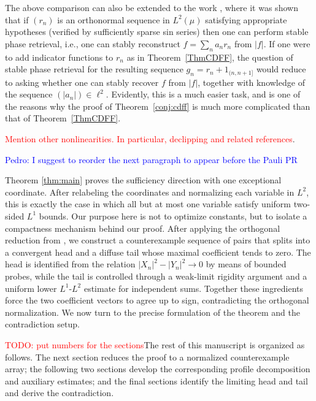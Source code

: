 \documentclass[11pt]{amsart}
\begin{document}
The above comparison can also be extended to the work \cite{christ2022examples}, where it was shown that if $(r_n)$ is an orthonormal sequence in $L^2(\mu)$ satisfying appropriate hypotheses (verified by sufficiently sparse sin series) then one can perform stable phase retrieval, i.e., one can stably reconstruct $f=\sum_n a_n r_n$ from $|f|$. If one were to add indicator functions to $r_n$ as in Theorem~\ref{ThmCDFF}, the question of stable phase retrieval for the resulting sequence $g_n=r_n+1_{(n,n+1]}$ would reduce to asking whether one can stably recover $f$ from $|f|$, together with knowledge of the sequence $(|a_n|)\in \ell^2.$ Evidently, this is a much easier task, and is one of the reasons why the proof of Theorem~\ref{conj:cdff} is much more complicated than that of Theorem~\ref{ThmCDFF}.




\textcolor{red}{Mention other nonlinearities. In particular, declipping \cite{abdalla2025sharp} and related references}.



\textcolor{blue}{Pedro: I suggest to reorder the next paragraph to appear before the Pauli PR}

Theorem \ref{thm:main} proves the sufficiency direction with
one exceptional coordinate. After relabeling the coordinates and normalizing
each variable in $L^2$, this is exactly the case in which all but at most one
variable satisfy uniform two-sided $L^1$ bounds. Our purpose here is not to
optimize constants, but to isolate a compactness mechanism behind our proof.
After applying the orthogonal reduction from \cite{FOTP}, we construct a counterexample sequence of pairs that splits
into a convergent head and a diffuse tail whose maximal coefficient tends to
zero. The head is identified from the relation $|X_n|^2-|Y_n|^2 \to 0$ by
means of bounded probes, while the tail is controlled through a weak-limit
rigidity argument and a uniform lower $L^1$-$L^2$ estimate for independent
sums. Together these ingredients force the two coefficient vectors to agree up
to sign, contradicting the orthogonal normalization. We now turn to the precise
formulation of the theorem and the contradiction setup. 

\textcolor{red}{TODO: put numbers for the sections}The rest of this manuscript is organized as follows. The next section
reduces the proof to a normalized counterexample array; the following two
sections develop the corresponding profile decomposition and auxiliary
estimates; and the final sections identify the limiting head and tail and
derive the contradiction.
\end{document}
